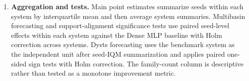 \begin{enumerate}
  \item \textbf{Aggregation and tests.} Main point estimates summarize seeds within each system by interquartile mean and then average system summaries. Multibasin forecasting and support-alignment significance tests use paired seed-level effects within each system against the Dense MLP baseline with Holm correction across systems. Dysts forecasting uses the benchmark system as the independent unit after seed-IQM summarization and applies paired one-sided sign tests with Holm correction. The family-count column is descriptive rather than tested as a monotone improvement metric.
\end{enumerate}
